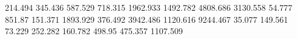214.494    345.436    %
587.529    718.315    %
1962.933   1492.782   %
4808.686   3130.558   %
54.777     851.87     %
151.371    1893.929   %
376.492    3942.486   %
1120.616   9244.467   %
35.077     149.561    %
73.229     252.282    %
160.782    498.95     %
475.357    1107.509   %
